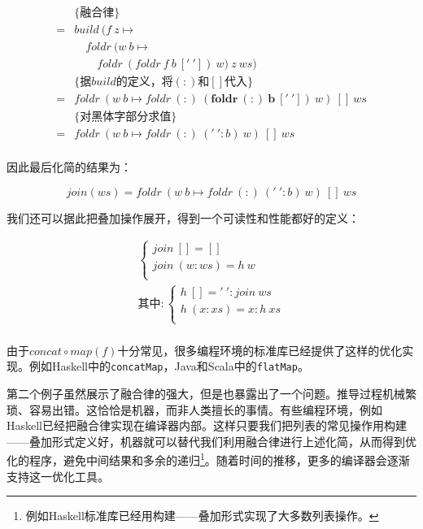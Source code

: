 \documentclass{article}
\begin{document}
\begin{example}
\[\begin{array}{rl}
  & \{\text{融合律}\} \\
= & build\ (f\ z \mapsto \\
  & \quad foldr\ (w\ b \mapsto \\
  & \quad \quad foldr\ (foldr\ f\ b\ ['\ '])\ w)\ z\ ws) \\

  & \{\text{据$build$的定义，将$(:)$和$[]$代入}\} \\
= & foldr\ (w\ b \mapsto foldr\ (:)\ \pmb{(foldr\ (:)\ b\ ['\ '])}\ w)\ []\ ws \\

  & \{\text{对黑体字部分求值}\} \\
= & foldr\ (w\ b \mapsto foldr\ (:)\ ('\ ' : b)\ w)\ []\ ws \\
\end{array} \]

因此最后化简的结果为：

\[
join(ws) = foldr\ (w\ b \mapsto foldr\ (:)\ ('\ ' : b)\ w)\ []\ ws
\]

我们还可以据此把叠加操作展开，得到一个可读性和性能都好的定义：

\[
\begin{array}{l}
\begin{cases}
join\ [] = [] \\
join\ (w:ws) = h\ w \\
\end{cases} \\
\text{其中}: \begin{cases}
             h\ [] = '\ ' : join\ ws \\
             h\ (x:xs) = x : h\ xs \\
             \end{cases} \\
\end{array}
\]

 
由于$concat \circ map(f)$十分常见，很多编程环境的标准库已经提供了这样的优化实现。例如Haskell中的\texttt{concatMap}，Java和Scala中的\texttt{flatMap}。
\end{example}

第二个例子虽然展示了融合律的强大，但是也暴露出了一个问题。推导过程机械繁琐、容易出错。这恰恰是机器，而非人类擅长的事情。有些编程环境，例如Haskell已经把融合律实现在编译器内部\cite{GLPJ-1993}。这样只要我们把列表的常见操作用构建——叠加形式定义好，机器就可以替代我们利用融合律进行上述化简，从而得到优化的程序，避免中间结果和多余的递归\footnote{例如Haskell标准库已经用构建——叠加形式实现了大多数列表操作。}。随着时间的推移，更多的编译器会逐渐支持这一优化工具。
\end{document}
